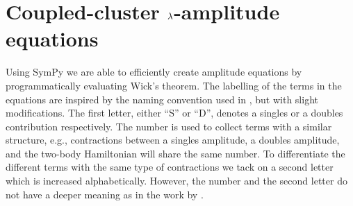     \section{Coupled-cluster $\lambda$-amplitude equations}
        \label{app:cc-lambda-amplitudes}
        Using SymPy \cite{sympy} we are able to efficiently create amplitude
        equations by programmatically evaluating Wick's theorem.
        The labelling of the terms in the equations are inspired by the naming
        convention used in  \cite{shavitt2009many},
        but with slight modifications.
        The first letter, either ``S'' or ``D'', denotes a singles or a doubles
        contribution respectively.
        The number is used to collect terms with a similar structure, e.g.,
        contractions between a singles amplitude, a doubles amplitude, and the
        two-body Hamiltonian will share the same number.
        To differentiate the different terms with the same type of contractions
        we tack on a second letter which is increased alphabetically.
        However, the number and the second letter do not have a deeper meaning
        as in the work by \citeauthor{shavitt2009many} \cite{shavitt2009many}.

